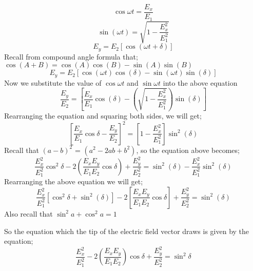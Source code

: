 \begin{equation}
\cos{\omega t} = \frac{E_x}{E_1}
\end{equation}
\begin{equation}
\sin (\omega t) = \sqrt{1-\frac{E_{x}^2}{E_{1}^2}}
\end{equation}
\begin{equation}
E_y = E_2 [\cos(\omega t + \delta)]
\end{equation}
Recall from compound angle formula that; $\cos(A+B) = \cos(A)\cos(B) - \sin(A)\sin(B)$ 
\begin{equation}
E_y = E_2 [\cos(\omega t)\cos(\delta) -\sin(\omega t) \sin(\delta)]
\end{equation}
Now we substitute the value of $\cos{\omega t}$ and $\sin{\omega t}$ into the above equation
\begin{equation}
\frac{E_y}{E_2} =[\frac{E_x}{E_1}\cos(\delta)-(\sqrt{1 - \frac{E_{x}^2}{E_{1}^2}})\sin(\delta)]
\end{equation}
Rearranging the equation and squaring both sides, we will get;
\begin{equation}
{[\frac{E_x}{E_1}\cos{\delta}-\frac{E_y}{E_2}]}^2 = [1-\frac{E_{x}^2}{E_{1}^2}]\sin^2(\delta)
\end{equation}
Recall that ${(a-b)}^2$ = $(a^2-2ab+b^2)$, so the equation above becomes;
\begin{dmath}
\frac{E_{x}^2}{E_{1}^2}\cos^2{\delta}-2(\frac{E_{x}E_{y}}{E_{1}E_{2}}\cos{\delta}) + \frac{E_{y}^2}{E_{2}^2} = \sin^2(\delta)-\frac{E_{x}^2}{E_{1}^2}\sin^2(\delta)
\end{dmath}
Rearranging the above equation we will get;
\begin{equation}
\frac{E_{x}^2}{E_{1}^2}[\cos^2{\delta} + \sin ^2(\delta)] - 2[\frac{E_{x}E_{y}}{E_{1}E_{2}}\cos{\delta}] + \frac{E_{y}^2}{E_{2}^2} = \sin^2(\delta)
\end{equation}
Also recall that $ \sin^2{a} + \cos^2{a} =  1$

So the equation which the tip of the electric field vector draws is given by the equation;
\begin{equation}
\frac{E_{x}^2}{E_{1}^2} -2(\frac{E_{x}E_{y}}{E_{1}E_{2}})\cos\delta + \frac{E_{y}^2}{E_{2}^2} =\sin^2 \delta
\label{eqn:locus_of_electric_field_vector}
\end{equation}

